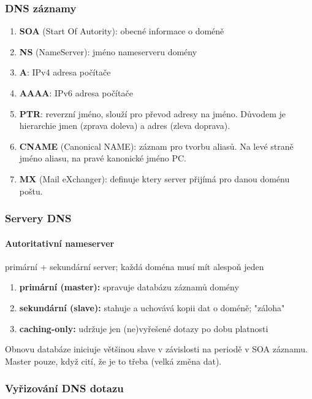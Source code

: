 \documentclass[10pt,a4paper]{article}
\begin{document}
\subsubsection{DNS záznamy}

\begin{enumerate}
    \item \textbf{SOA} (Start Of Autority): obecné informace o doméně
    \item \textbf{NS} (NameServer): jméno nameserveru domény
    \item \textbf{A}: IPv4 adresa počítače
    \item \textbf{AAAA}: IPv6 adresa počítače
    \item \textbf{PTR}: reverzní jméno, slouží pro převod adresy na jméno. Důvodem je hierarchie jmen (zprava doleva) a adres (zleva doprava).
    \item \textbf{CNAME} (Canonical NAME): záznam pro tvorbu aliasů. Na levé straně jméno aliasu, na pravé kanonické jméno PC.
    \item \textbf{MX} (Mail eXchanger): definuje ktery server přijímá pro danou doménu poštu.
\end{enumerate}

\subsubsection{Servery DNS}

\paragraph{Autoritativní nameserver} primární + sekundární server; každá doména musí mít alespoň jeden

\begin{enumerate}
    \item \textbf{primární (master):} spravuje databázu záznamů domény
    \item \textbf{sekundární (slave):} stahuje a uchovává kopii dat o doméně; "záloha"
    \item \textbf{caching-only:} udržuje jen (ne)vyřešené dotazy po dobu platnosti
\end{enumerate}

Obnovu databáze iniciuje většinou slave v závislosti na periodě v SOA záznamu. Master pouze, když cití, že je to třeba (velká změna dat).

\subsubsection{Vyřizování DNS dotazu}
\end{document}
